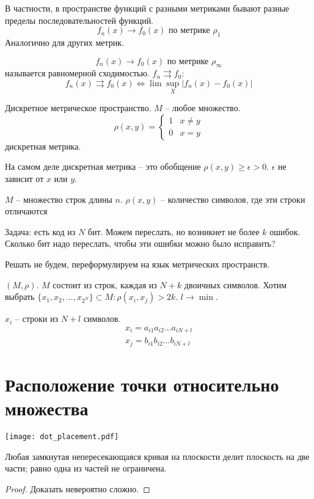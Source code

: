 \documentclass[main]{subfiles}
\begin{document}
В частности, в пространстве функций с разными метриками бывают разные пределы последовательностей функций.
\[f_n(x) \to f_0(x) \text{ по метрике } \rho_1\]
Аналогично для других метрик.

\[f_n(x) \to f_0(x) \text{ по метрике } \rho_\infty\]
называется равномерной сходимостью. $f_n \rightrightarrows f_0$:
\[f_n(x) \rightrightarrows f_0(x) \Leftrightarrow \lim \sup_X |f_n(x) - f_0(x)|\]

\begin{example}
    Дискретное метрическое пространство. $M$ -- любое множество.
    \[\rho(x,y) = \begin{cases}
            1 & x \neq y \\
            0 & x =y
        \end{cases}\]
    дискретная метрика.
\end{example}

\begin{example}
    На самом деле дискретная метрика -- это обобщение $\rho(x,y) \ge \epsilon >0$.
    $\epsilon$ не зависит от $x$ или $y$.
\end{example}

\begin{example}
    $M$ -- множество строк длины $n$. $\rho(x,y)$ -- количество символов, где эти
    строки отличаются
\end{example}

\begin{example}
    Задача: есть код из $N$ бит. Можем переслать, но возникнет не более $k$ ошибок.
    Сколько бит надо переслать, чтобы эти ошибки можно было исправить?

    Решать не будем, переформулируем на язык метрических пространств.

    $(M,\rho)$. $M$ состоит из строк, каждая из $N+k$ двоичных символов.
    Хотим выбрать $\{x_1, x_2,..., x_{2^N}\} \subset M: \rho(x_i, x_j) > 2k$.
    $l \to \min$.

    $x_i$ -- строки из $N+l$ символов.
    \begin{gather*}
        x_i = a_{i1}a_{i2}...a_{iN+l}\\
        x_j = b_{i1}b_{i2}...b_{iN+l}
    \end{gather*}
\end{example}

\section{Расположение точки относительно множества}
\begin{center}
    \texttt{[image: dot\_placement.pdf]}
\end{center}
\begin{theorem}[Жордана]
    Любая замкнутая непересекающаяся кривая на плоскости делит
    плоскость на две части; равно одна из частей не ограничена.
\end{theorem}
\begin{proof}
    Доказать невероятно сложно.
\end{proof}
\end{document}
